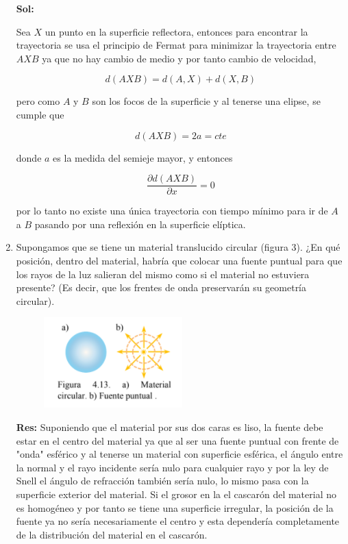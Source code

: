 \documentclass[12pt,a4paper]{article}
\begin{document}
\begin{enumerate}
\textbf{Sol:} 

Sea $X$ un punto en la superficie reflectora, entonces para encontrar la trayectoria se usa el principio de Fermat para minimizar la trayectoria entre $AXB$ ya que no hay cambio de medio y por tanto cambio de velocidad,

\begin{equation*}
    d(AXB) = d(A,X) + d(X,B)
\end{equation*}

pero como $A$ y $B$ son los focos de la superficie y al tenerse una elipse, se cumple que

\begin{equation*}
    d(AXB) = 2a = cte
\end{equation*}

donde $a$ es la medida del semieje mayor, y entonces

\begin{equation*}
    \frac{\partial d(AXB)}{\partial x} = 0
\end{equation*}

por lo tanto no existe una única trayectoria con tiempo mínimo para ir de $A$ a $B$ pasando por una reflexión en la superficie elíptica.








\item Supongamos que se tiene un material translucido circular (figura 3). ¿En qué posición, dentro del material, habría que colocar una fuente puntual para que los rayos de la luz salieran del mismo como si el material no estuviera presente? (Es decir, que los frentes de onda preservarán su geometría circular).

\begin{figure}[h!]
    \centering
    \includegraphics{3.PNG}
    \caption{}
    \label{fig:my_label}
\end{figure}

\textbf{Res:} Suponiendo que el material por sus dos caras es liso, la fuente debe estar en el centro del material ya que al ser una fuente puntual con frente de "onda" esférico y al tenerse un material con superficie esférica, el ángulo entre la normal y el rayo incidente sería nulo para cualquier rayo y por la ley de Snell el ángulo de refracción también sería nulo, lo mismo pasa con la superficie exterior del material. Si el grosor en la el cascarón del material no es homogéneo y por tanto se tiene una superficie irregular, la posición de la fuente ya no sería necesariamente el centro y esta dependería completamente de la distribución del material en el cascarón.



\end{enumerate}
\end{document}

